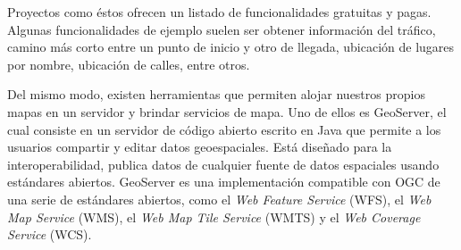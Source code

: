 Proyectos como éstos ofrecen un listado de funcionalidades gratuitas y pagas. Algunas funcionalidades de ejemplo suelen ser obtener información del tráfico, camino más corto entre un punto de inicio y otro de llegada, ubicación de lugares por nombre, ubicación de calles, entre otros.

Del mismo modo, existen herramientas que permiten alojar nuestros propios mapas en un servidor y brindar servicios de mapa. Uno de ellos es GeoServer, el cual consiste en un servidor de código abierto escrito en Java que permite a los usuarios compartir y editar datos geoespaciales. Está diseñado para la interoperabilidad, publica datos de cualquier fuente de datos espaciales usando estándares abiertos. GeoServer es una implementación compatible con OGC de una serie de estándares abiertos, como el \textit{Web Feature Service} (WFS), el \textit{Web Map Service} (WMS), el \textit{Web Map Tile Service} (WMTS) y el \textit{Web Coverage Service} (WCS).
